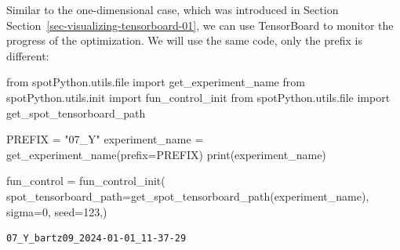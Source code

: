 \documentclass[
  letterpaper,
  DIV=11,
  numbers=noendperiod]{scrreprt}
\newenvironment{Shaded}{\begin{snugshade}}{\end{snugshade}}
\newcommand{\BuiltInTok}[1]{\textcolor[rgb]{0.00,0.23,0.31}{#1}}
\newcommand{\DecValTok}[1]{\textcolor[rgb]{0.68,0.00,0.00}{#1}}
\newcommand{\ImportTok}[1]{\textcolor[rgb]{0.00,0.46,0.62}{#1}}
\newcommand{\NormalTok}[1]{\textcolor[rgb]{0.00,0.23,0.31}{#1}}
\newcommand{\OperatorTok}[1]{\textcolor[rgb]{0.37,0.37,0.37}{#1}}
\newcommand{\StringTok}[1]{\textcolor[rgb]{0.13,0.47,0.30}{#1}}
\begin{document}
\begin{tcolorbox}[enhanced jigsaw, opacityback=0, left=2mm, title=\textcolor{quarto-callout-note-color}{\faInfo}\hspace{0.5em}{TensorBoard}, bottomrule=.15mm, titlerule=0mm, arc=.35mm, leftrule=.75mm, colbacktitle=quarto-callout-note-color!10!white, bottomtitle=1mm, opacitybacktitle=0.6, coltitle=black, colframe=quarto-callout-note-color-frame, toprule=.15mm, breakable, colback=white, toptitle=1mm, rightrule=.15mm]

Similar to the one-dimensional case, which was introduced in Section
Section~\ref{sec-visualizing-tensorboard-01}, we can use TensorBoard to
monitor the progress of the optimization. We will use the same code,
only the prefix is different:

\begin{Shaded}
\begin{Highlighting}[]
\ImportTok{from}\NormalTok{ spotPython.utils.}\BuiltInTok{file} \ImportTok{import}\NormalTok{ get\_experiment\_name}
\ImportTok{from}\NormalTok{ spotPython.utils.init }\ImportTok{import}\NormalTok{ fun\_control\_init}
\ImportTok{from}\NormalTok{ spotPython.utils.}\BuiltInTok{file} \ImportTok{import}\NormalTok{ get\_spot\_tensorboard\_path}

\NormalTok{PREFIX }\OperatorTok{=} \StringTok{"07\_Y"}
\NormalTok{experiment\_name }\OperatorTok{=}\NormalTok{ get\_experiment\_name(prefix}\OperatorTok{=}\NormalTok{PREFIX)}
\BuiltInTok{print}\NormalTok{(experiment\_name)}

\NormalTok{fun\_control }\OperatorTok{=}\NormalTok{ fun\_control\_init(}
\NormalTok{    spot\_tensorboard\_path}\OperatorTok{=}\NormalTok{get\_spot\_tensorboard\_path(experiment\_name),}
\NormalTok{    sigma}\OperatorTok{=}\DecValTok{0}\NormalTok{,}
\NormalTok{    seed}\OperatorTok{=}\DecValTok{123}\NormalTok{,)}
\end{Highlighting}
\end{Shaded}

\begin{verbatim}
07_Y_bartz09_2024-01-01_11-37-29
\end{verbatim}

\end{tcolorbox}
\end{document}
